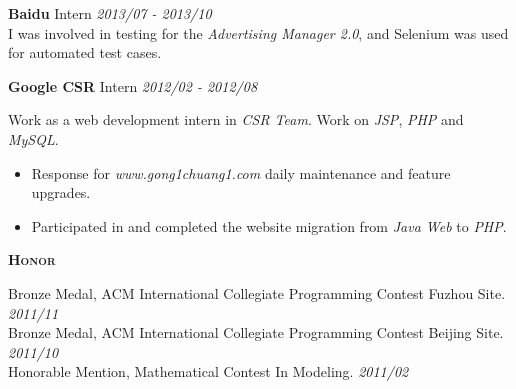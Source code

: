 \documentclass[a4paper]{article}
\newenvironment{changemargin}[2]{%
  \begin{list}{}{%
    \setlength{\topsep}{0pt}%
    \setlength{\leftmargin}{#1}%
    \setlength{\rightmargin}{#2}%
    \setlength{\listparindent}{\parindent}%
    \setlength{\itemindent}{\parindent}%
    \setlength{\parsep}{\parskip}%
  }%
  \item[]}{\end{list}
}
\newcommand{\lineover}{
	\begin{changemargin}{-0.05in}{-0.05in}
		\vspace*{-8pt}
		\hrulefill \\
		\vspace*{-2pt}
	\end{changemargin}
}
\newcommand{\header}[1]{
	\begin{changemargin}{-0.5in}{-0.5in}
		\scshape{\textbf{#1}}\\
	\end{changemargin}
}
\newenvironment{body} {
	\vspace*{-16pt}
	\begin{changemargin}{-0.5in}{-0.5in}
  }
	{\end{changemargin}
}
\begin{document}
\begin{body}
	\medskip
	
	\textbf{Baidu} \hfill Intern \emph{2013/07 - 2013/10}\\ 
	\smallskip
	I was involved in testing for the \emph{Advertising Manager 2.0}, and Selenium was used for automated test cases.
	\medskip
	
	\textbf{Google CSR} \hfill Intern \emph{2012/02 - 2012/08}\\ 
	\smallskip
	
	Work as a web development intern in \emph{CSR Team}. Work on \emph{JSP}, \emph{PHP} and \emph{MySQL}.
	\vspace*{-4pt}

	\begin{itemize} \itemsep -0pt  %
		\item Response for \emph{www.gong1chuang1.com} daily maintenance and feature upgrades.\\
	\end{itemize}
	\vspace*{-8pt}
	\begin{itemize} \itemsep -0pt  %
		\item Participated in and completed the website migration from \emph{Java Web} to \emph{PHP}.\\
	\end{itemize}

\end{body}

\medskip

\header{Honor}
\begin{body}
	\vspace{14pt}
	Bronze Medal, ACM International Collegiate Programming Contest Fuzhou Site. \hfill \emph{2011/11}\\
	Bronze Medal, ACM International Collegiate Programming Contest Beijing Site. \hfill \emph{2011/10}\\
	Honorable Mention, Mathematical Contest In Modeling. \hfill \emph{2011/02}\\
\end{body}
\end{document}
